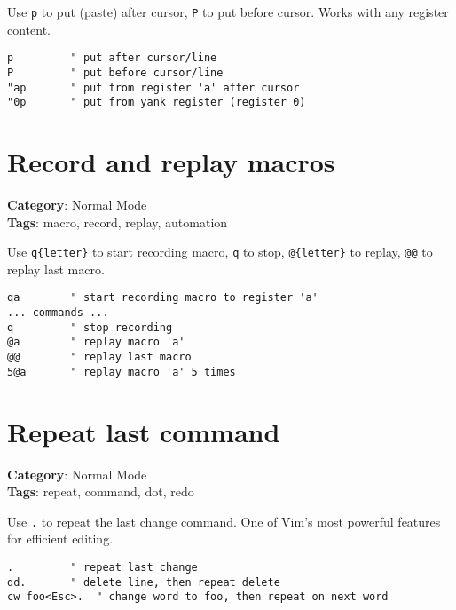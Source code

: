{{{{{{{{{{Use {\footnotesize \Verb§p§} to put (paste) after cursor, {\footnotesize \Verb§P§} to put before cursor. Works with any register content.

\begin{Exa*}{}
\begin{Verbatim}[fontsize=\footnotesize, breaklines, breakanywhere]
p         " put after cursor/line
P         " put before cursor/line
"ap       " put from register 'a' after cursor
"0p       " put from yank register (register 0)
\end{Verbatim}
\end{Exa*}

\section{Record and replay macros}

\textbf{Category}: Normal Mode\\ \textbf{Tags}: macro, record, replay, automation
\vspace{0.5cm}

Use {\footnotesize \Verb§q{letter}§} to start recording macro, {\footnotesize \Verb§q§} to stop, {\footnotesize \Verb§@{letter}§} to replay, {\footnotesize \Verb§@@§} to replay last macro.

\begin{Exa*}{}
\begin{Verbatim}[fontsize=\footnotesize, breaklines, breakanywhere]
qa        " start recording macro to register 'a'
... commands ...
q         " stop recording
@a        " replay macro 'a'
@@        " replay last macro
5@a       " replay macro 'a' 5 times
\end{Verbatim}
\end{Exa*}

\section{Repeat last command}

\textbf{Category}: Normal Mode\\ \textbf{Tags}: repeat, command, dot, redo
\vspace{0.5cm}

Use {\footnotesize \Verb§.§} to repeat the last change command. One of Vim's most powerful features for efficient editing.

\begin{Exa*}{}
\begin{Verbatim}[fontsize=\footnotesize, breaklines, breakanywhere]
.         " repeat last change
dd.       " delete line, then repeat delete
cw foo<Esc>.  " change word to foo, then repeat on next word
\end{Verbatim}
\end{Exa*}

}}}}}}}}}}
